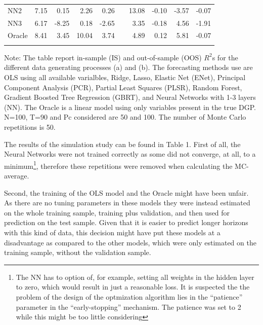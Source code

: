 \documentclass[]{article}
\let\rmarkdownfootnote\footnote%
\def\footnote{\protect\rmarkdownfootnote}
\begin{document}
\begin{table}[ht]
\begin{threeparttable}
\begin{tabular}{lrrrrcrrrr}
NN2 & 7.15 & 0.15 & 2.26 & 0.26 && 13.08 & -0.10 & -3.57 & -0.07 \\ 
NN3 & 6.17 & -8.25 & 0.18 & -2.65 && 3.35 & -0.18 & 4.56 & -1.91 \\ 
Oracle & 8.41 & 3.45 & 10.04 & 3.74 && 4.89 & 0.12 & 5.81 & -0.07 \\ 
   \Xhline{2\arrayrulewidth}
\end{tabular}
\begin{tablenotes}
      \small
      \item Note: The table report in-sample (IS) and out-of-sample (OOS) $R^2$s for the different data generating processes (a) and (b). The forecasting methods use are OLS using all available varialbles, Ridge, Lasso, Elastic Net (ENet), Principal Component Analysis (PCR), Partial Least Squares (PLSR), Random Forest, Gradient Boosted Tree Regression (GBRT), and Neural Networks with 1-3 layers (NN). The Oracle is a linear model using only variables present in the true DGP. N=100, T=90 and Pc considered are 50 and 100. The number of Monte Carlo repetitions is 50.
    \end{tablenotes}
  \end{threeparttable}
\label{table:simulation}
\end{table}

The results of the simulation study can be found in Table 1. First of
all, the Neural Networks were not trained correctly as some did not
converge, at all, to a minimum\footnote{The NN has to option of, for
  example, setting all weights in the hidden layer to zero, which would
  result in just a reasonable loss. It is suspected the the problem of
  the design of the optmization algorithm lies in the ``patience''
  parameter in the ``early-stopping'' mechanism. The patience was set to
  2 while this might be too little considering }, therefore these
repetitions were removed when calculating the MC-average.

Second, the training of the OLS model and the Oracle might have been
unfair. As there are no tuning parameters in these models they were
instead estimated on the whole training sample, training plus
validation, and then used for prediction on the test sample. Given that
it is easier to predict longer horizons with this kind of data, this
decision might have put these models at a disadvantage as compared to
the other models, which were only estimated on the training sample,
without the validation sample.
\end{document}
